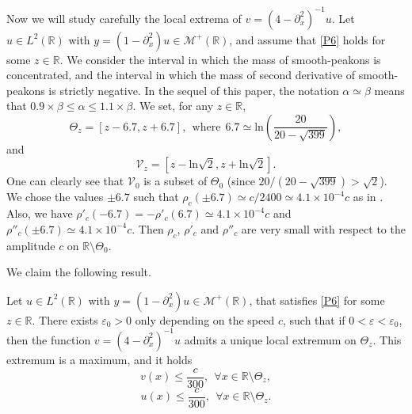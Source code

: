 \documentclass[10pt,a4paper,twoside]{article}
\begin{document}
Now we will study carefully the local extrema of $v=(4-\partial^{2}_{x})^{-1}u$. Let $u\in L^{2}(\mathbb{R})$ with $y = (1-\partial^{2}_{x})u\in\mathcal{M}^{+}(\mathbb{R})$, and assume that \eqref{P6} holds for some $z\in\mathbb{R}$. We consider the interval in which the mass of smooth-peakons is concentrated, and the interval in which the mass of second derivative of smooth-peakons is strictly negative. In the sequel of this paper, the notation $\alpha\simeq\beta$ means that $0.9\times\beta\le\alpha\le 1.1\times\beta$. We set, for any $ z\in \mathbb R $, 
\begin{equation}
\Theta_z=[z-6.7,z+6.7],~~\text{where}~~6.7\simeq\text{ln}\left(\frac{20}{20-\sqrt{399}}\right),
\label{P12}
\end{equation}
and
\begin{equation}\label{P13}
\mathcal{V}_z=\left[z-\text{ln}\sqrt{2},z+\text{ln}\sqrt{2}\right].
\end{equation}
One can clearly see that $\mathcal{V}_0$ is a subset of $\Theta_0$ (since $20/(20-\sqrt{399})>\sqrt{2}$). We chose the values $\pm 6.7$ such that $\rho_{c}(\pm 6.7)\simeq c/2400\simeq 4.1\times 
10^{-4}c$ as in \cite{AK}. Also, we have $\rho'_{c}(-6.7)=-\rho'_{c}(6.7)\simeq 4.1\times 10^{-4}c$ and 
$\rho''_{c}(\pm 6.7)\simeq 4.1\times 10^{-4}c$. Then $\rho_{c}$, 
$\rho'_{c}$ and $\rho''_{c}$ are very small with respect to the amplitude $c$ on $\mathbb{R}\setminus\Theta_0$. 

We claim the following result.





\begin{Lem}\label{Lemma PP2}
Let $u\in L^{2}(\mathbb{R})$ with $y=(1-\partial^{2}_{x})u\in\mathcal{M}^{+}(\mathbb{R})$, that satisfies 
\eqref{P6} for some $z\in\mathbb{R}$. There exists $\varepsilon_{0}>0$ only depending on the speed $c$, such that if $0<\varepsilon<\varepsilon_{0}$, then the function $v=(4-\partial^{2}_{x})^{-1}u$ admits a unique local extremum on $\Theta_z $. This extremum is a maximum, and it holds
\begin{equation}
v(x)\le\frac{c}{300},~~\forall x\in\mathbb{R}\setminus\Theta_z,
\label{P14}
\end{equation}
\begin{equation}
u(x)\le\frac{c}{300},~~\forall x\in\mathbb{R}\setminus\Theta_z.
\label{P15}
\end{equation}
\end{Lem}
\end{document}
